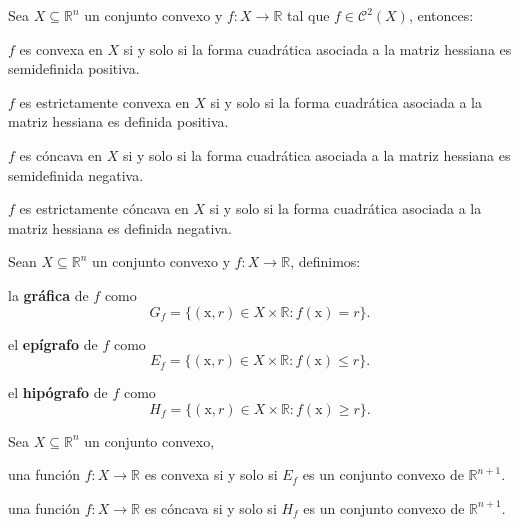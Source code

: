\documentclass[8pt,a4paper]{extarticle}
\begin{document}
\begin{multicols}{3}
	\sectionbreak

	\begin{boxtheo}
		Sea $X \subseteq \mathbb{R}^n$ un conjunto convexo y $f : X \to \mathbb{R}$ tal que $f \in \mathcal{C}^2(X)$, entonces:
		\begin{eqlist}
			\item $f$ es convexa en $X$ si y solo si la forma cuadrática asociada a la matriz hessiana es semidefinida positiva.
			\item $f$ es estrictamente convexa en $X$ si y solo si la forma cuadrática asociada a la matriz hessiana es definida positiva.
			\item $f$ es cóncava en $X$ si y solo si la forma cuadrática asociada a la matriz hessiana es semidefinida negativa.
			\item $f$ es estrictamente cóncava en $X$ si y solo si la forma cuadrática asociada a la matriz hessiana es definida negativa.
		\end{eqlist}
	\end{boxtheo}

	\begin{boxdef}
		Sean $X \subseteq \mathbb{R}^n$ un conjunto convexo y $f : X \to \mathbb{R}$, definimos:
		\begin{bulletlist}
			\item la \textbf{gráfica} de $f$ como $$G_f = \{ (\mathrm{x}, r) \in X \times \mathbb{R} : f(\mathrm{x}) = r \} .$$
			\item el \textbf{epígrafo} de $f$ como $$E_f = \{ (\mathrm{x}, r) \in X \times \mathbb{R} : f(\mathrm{x}) \le r \} .$$
			\item el \textbf{hipógrafo} de $f$ como $$H_f = \{ (\mathrm{x}, r) \in X \times \mathbb{R} : f(\mathrm{x}) \ge r \} .$$
		\end{bulletlist}
	\end{boxdef}

	\begin{boxtheo}
		Sea $X \subseteq \mathbb{R}^n$ un conjunto convexo,
		\begin{eqlist}
			\item una función $f : X \to \mathbb{R}$ es convexa si y solo si $E_f$ es un conjunto convexo de $\mathbb{R}^{n+1}$.
			\item una función $f : X \to \mathbb{R}$ es cóncava si y solo si $H_f$ es un conjunto convexo de $\mathbb{R}^{n+1}$.
		\end{eqlist}
	\end{boxtheo}


\end{multicols}
\end{document}

